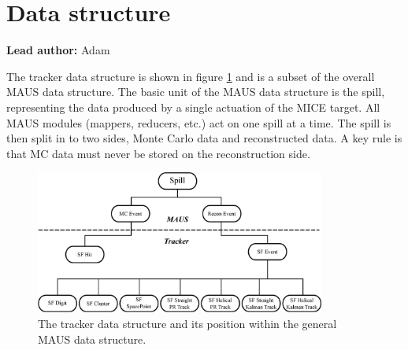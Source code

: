 \section{Data structure}
\label{Sect:DataStructure}

{\bf Lead author:} Adam

The tracker data structure is shown in figure \ref{Fig:DataStructure} and is a subset of the overall MAUS data structure.  The basic unit of the MAUS data structure is the spill, representing the data produced by a single actuation of the MICE target.  All MAUS modules (mappers, reducers, etc.) act on one spill at a time.  The spill is then split in to two sides, Monte Carlo data and reconstructed data.  A key rule is that MC data must never be stored on the reconstruction side.


\begin{figure}[htb]
    \includegraphics[width=0.85\textwidth]
      {05-DataStructure/Figures/DataStructure.eps}
    \caption{The tracker data structure and its position within the general MAUS data structure.}
    \label{Fig:DataStructure}
\end{figure}